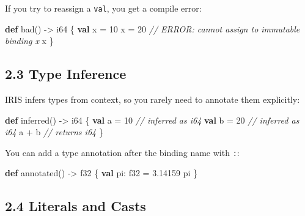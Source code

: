 \documentclass[
  english,
]{book}
\newenvironment{Shaded}{\begin{snugshade}}{\end{snugshade}}
\newcommand{\CommentTok}[1]{\textcolor[rgb]{0.42,0.60,0.33}{\textit{#1}}}
\newcommand{\DataTypeTok}[1]{\textcolor[rgb]{0.31,0.79,0.69}{#1}}
\newcommand{\DecValTok}[1]{\textcolor[rgb]{0.71,0.81,0.66}{#1}}
\newcommand{\FloatTok}[1]{\textcolor[rgb]{0.71,0.81,0.66}{#1}}
\newcommand{\KeywordTok}[1]{\textcolor[rgb]{0.34,0.61,0.84}{\textbf{#1}}}
\newcommand{\NormalTok}[1]{\textcolor[rgb]{0.83,0.83,0.83}{#1}}
\newcommand{\OperatorTok}[1]{\textcolor[rgb]{0.83,0.83,0.83}{#1}}
\begin{document}
If you try to reassign a \texttt{val}, you get a compile error:

\begin{Shaded}
\begin{Highlighting}[]
\KeywordTok{def}\NormalTok{ bad() }\OperatorTok{{-}\textgreater{}} \DataTypeTok{i64}\NormalTok{ \{}
    \KeywordTok{val}\NormalTok{ x }\OperatorTok{=} \DecValTok{10}
\NormalTok{    x }\OperatorTok{=} \DecValTok{20}   \CommentTok{// ERROR: cannot assign to immutable binding \textquotesingle{}x\textquotesingle{}}
\NormalTok{    x}
\NormalTok{\}}
\end{Highlighting}
\end{Shaded}

\subsection{2.3 Type Inference}\label{type-inference}

IRIS infers types from context, so you rarely need to annotate them
explicitly:

\begin{Shaded}
\begin{Highlighting}[]
\KeywordTok{def}\NormalTok{ inferred() }\OperatorTok{{-}\textgreater{}} \DataTypeTok{i64}\NormalTok{ \{}
    \KeywordTok{val}\NormalTok{ a }\OperatorTok{=} \DecValTok{10}        \CommentTok{// inferred as i64}
    \KeywordTok{val}\NormalTok{ b }\OperatorTok{=} \DecValTok{20}        \CommentTok{// inferred as i64}
\NormalTok{    a }\OperatorTok{+}\NormalTok{ b             }\CommentTok{// returns i64}
\NormalTok{\}}
\end{Highlighting}
\end{Shaded}

You can add a type annotation after the binding name with \texttt{:}:

\begin{Shaded}
\begin{Highlighting}[]
\KeywordTok{def}\NormalTok{ annotated() }\OperatorTok{{-}\textgreater{}} \DataTypeTok{f32}\NormalTok{ \{}
    \KeywordTok{val}\NormalTok{ pi: }\DataTypeTok{f32} \OperatorTok{=} \FloatTok{3.14159}
\NormalTok{    pi}
\NormalTok{\}}
\end{Highlighting}
\end{Shaded}

\subsection{2.4 Literals and Casts}\label{literals-and-casts}
\end{document}
